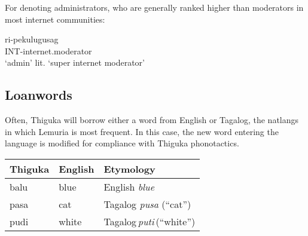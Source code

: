 \documentclass{article}
\begin{document}
\begin{multicols}{2}
For denoting administrators, who are generally ranked higher than moderators in most internet communities:

\begin{exe}
    \ex{} \gll  ri-pekulugusag\\
                INT-internet.moderator\\
    \glt{}      `admin'
    \glt{}      lit. `super internet moderator'
\end{exe}

\subsection{Loanwords}
Often, Thiguka will borrow either a word from English or Tagalog, the natlangs in which Lemuria is most frequent.
In this case, the new word entering the language is modified for compliance with Thiguka phonotactics.

\begin{center}
\begin{tabular}{ m{1cm} m{1cm} | m{4cm} }
    Thiguka & English & Etymology\\
    \hline
    balu & blue  & English \emph{blue}\\
    pasa & cat   & Tagalog \emph{pusa} (``cat'')\\
    pudi & white & Tagalog\,\emph{puti}\,(``white'')\\
\end{tabular}
\end{center}

\end{multicols}
\end{document}
